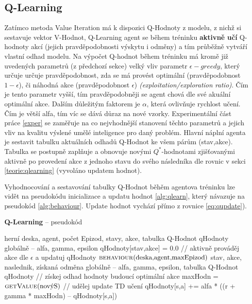 \subsection*{Q-Learning}
\label{navrh:qlearnagent}
Zatímco metoda Value Iteration má k dispozici Q-Hodnoty z modelu, z nichž si sestavuje vektor V-Hodnot, Q-Learning agent se během tréninku \textbf{aktivně učí} Q-hodnoty akcí (jejich pravděpodobnosti výskytu i odměny) a tím průběžně vytváří vlastní odhad modelu. Na výpočet Q-hodnot během tréninku má kromě již uvedených parametrů (z předchozí sekce) velký vliv parametr $\epsilon-greedy$, který určuje určuje pravděpodobnost, zda se má provést optimální (pravděpodobnost $1-\epsilon$), či náhodná akce (pravděpodobnost $\epsilon$) \textit{(exploitation/exploration ratio)}. Čím je tento parametr vyšší, tím pravděpodobněji se agent chová dle své akuální optimální akce. Dalším důležitým faktorem je $\alpha$, která ovlivňuje rychlost učení. Čím je větší alfa, tím víc se dává důraz na nové vzorky. Experimentální část práce \ref{exper} se zaměřuje na co nejvhodnější stanovení těchto parametrů a jejich vliv na kvalitu výslené umělé inteligence pro daný problém.
\newline
Hlavní náplní agenta je sestavit tabulku aktuálních odhadů Q-Hodnot ke všem párům (stav,akce). Tabulka se postupně zaplňuje a obnovuje novými $Q^*$-hodnotami zjišťovanými aktivně po provedení akce z jednoho stavu do svého následníka dle rovnic v sekci \ref{teorie:qlearning} (vyvoláno updatem hodnot).

Vyhodnocování a sestavování tabulky Q-Hodnot běhěm agentova tréninku lze vidět na pseudokódu inicializace a updatu hodnot \ref{alg:qlearn}, který návazuje na pseudokód \ref{alg:behaviour}. Update hodnot vychází přímo z rovnice \ref{eq:qupdate}).
\begin{algorithm}
\caption{\textbf{Q-Learning} -- pseudokód}
\label{alg:qlearn}
\begin{algorithmic}[1]
\Require herní deska, agent, počet Epizod, stavy, akce, tabulka Q-Hodnot qHodnoty
\Require globálně -- alfa, gamma, epsilon
      \State qHodnoty[stav,akce] = 0.0 
    \EndFor
  \EndFor
  \State // aktivně prováděj akce dle $\epsilon$ a updatuj qHodnoty
  \State $\text{\Call{behaviour}{deska,agent,maxEpizod}}$
\EndProcedure
\algrule
\Require stav, akce, naslednik, získaná odměna
\Require globálně -- alfa, gamma, epsilon, tabulka Q-Hodnot qHodnoty
  \State // získej odhad hodnoty budoucí optimální akce
  \State maxHodn = $\text{\Call{getValue}{novýS}}$
  \State // udělej update TD učení
  \State qHodnoty[s,a] +=  alfa * ((r + gamma * maxHodn) -- qHodnoty[s,a])
\EndProcedure
\end{algorithmic}
\end{algorithm}
\newpage

